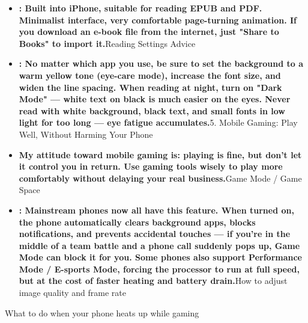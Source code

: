 \begin{itemize}
  \item \textbf{: Built into iPhone, suitable for reading EPUB and PDF. Minimalist interface, very comfortable page-turning animation. If you download an e-book file from the internet, just "Share to Books" to import it.}Reading Settings Advice
  \item \textbf{: No matter which app you use, be sure to set the background to a warm yellow tone (eye-care mode), increase the font size, and widen the line spacing. When reading at night, turn on "Dark Mode" — white text on black is much easier on the eyes. Never read with white background, black text, and small fonts in low light for too long — eye fatigue accumulates.}5. Mobile Gaming: Play Well, Without Harming Your Phone
  \item \textbf{My attitude toward mobile gaming is: playing is fine, but don't let it control you in return. Use gaming tools wisely to play more comfortably without delaying your real business.}Game Mode / Game Space
  \item \textbf{: Mainstream phones now all have this feature. When turned on, the phone automatically clears background apps, blocks notifications, and prevents accidental touches — if you're in the middle of a team battle and a phone call suddenly pops up, Game Mode can block it for you. Some phones also support Performance Mode / E-sports Mode, forcing the processor to run at full speed, but at the cost of faster heating and battery drain.}How to adjust image quality and frame rate
\end{itemize}


What to do when your phone heats up while gaming

